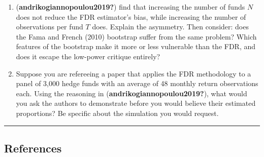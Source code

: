 \documentclass[
  letterpaper,
  DIV=11,
  numbers=noendperiod]{scrartcl}
\begin{document}
\begin{enumerate}
\item
  (\textbf{andrikogiannopoulou2019?}) find that increasing the number of
  funds \(N\) does not reduce the FDR estimator's bias, while increasing
  the number of observations per fund \(T\) does. Explain the asymmetry.
  Then consider: does the Fama and French (2010) bootstrap suffer from
  the same problem? Which features of the bootstrap make it more or less
  vulnerable than the FDR, and does it escape the low-power critique
  entirely?
\item
  Suppose you are refereeing a paper that applies the FDR methodology to
  a panel of 3,000 hedge funds with an average of 48 monthly return
  observations each. Using the reasoning in
  (\textbf{andrikogiannopoulou2019?}), what would you ask the authors to
  demonstrate before you would believe their estimated proportions? Be
  specific about the simulation you would request.
\end{enumerate}

\begin{center}\rule{0.5\linewidth}{0.5pt}\end{center}

\subsection{References}\label{references}
\end{document}
